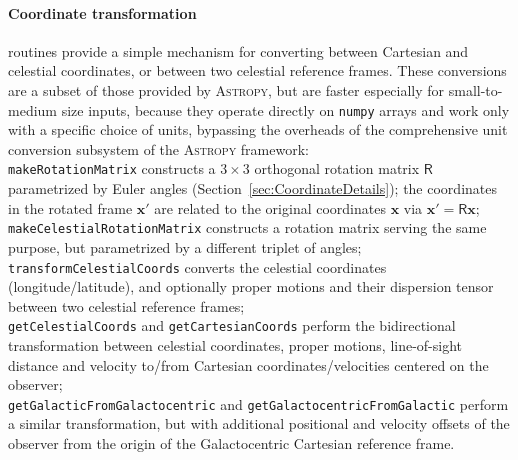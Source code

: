 \documentclass[12pt]{article}
\begin{document}
\paragraph{Coordinate transformation} routines provide a simple mechanism for converting between Cartesian and celestial coordinates, or between two celestial reference frames. These conversions are a subset of those provided by \textsc{Astropy}, but are faster especially for small-to-medium size inputs, because they operate directly on \texttt{numpy} arrays and work only with a specific choice of units, bypassing the overheads of the comprehensive unit conversion subsystem of the \textsc{Astropy} framework:\\
\texttt{makeRotationMatrix} constructs a $3\times3$ orthogonal rotation matrix $\mathsf R$ parametrized by Euler angles (Section~\ref{sec:CoordinateDetails}); the coordinates in the rotated frame $\boldsymbol x'$ are related to the original coordinates $\boldsymbol x$ via $\boldsymbol x' = \mathsf R \boldsymbol x$;\\
\texttt{makeCelestialRotationMatrix} constructs a rotation matrix serving the same purpose, but parametrized by a different triplet of angles;\\
\texttt{transformCelestialCoords} converts the celestial coordinates (longitude/latitude), and optionally proper motions and their dispersion tensor between two celestial reference frames;\\
\texttt{getCelestialCoords} and \texttt{getCartesianCoords} perform the bidirectional transformation between celestial coordinates, proper motions, line-of-sight distance and velocity to/from Cartesian coordinates/velocities centered on the observer;\\
\texttt{getGalacticFromGalactocentric} and \texttt{getGalactocentricFromGalactic} perform a similar transformation, but with additional positional and velocity offsets of the observer from the origin of the Galactocentric Cartesian reference frame.
\end{document}
